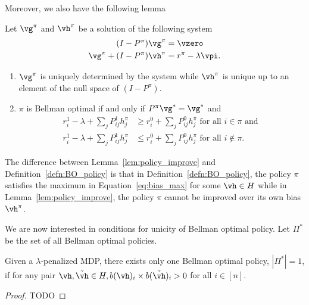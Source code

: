 Moreover, we also have the following lemma
\begin{lem}
    \label{lem:policy_improve}
    Let $\vg^\pi$ and $\vh^\pi$ be a solution of the following system
    \begin{align}
        (I-P^\pi)\vg^\pi &=\vzero \label{eq:gain_eval}\\
        \vg^\pi +(I-P^\pi)\vh^\pi &= r^\pi -\lambda\vpi \label{eq:bias_eval}.
    \end{align}
    \begin{enumerate}
        \item $\vg^\pi$ is uniquely determined by the system while $\vh^\pi$ is unique up to an element of the null space of $(I-P^\pi)$.
        \item $\pi$ is Bellman optimal if and only if $P^\pi\vg^*=\vg^*$ and
            \begin{align*}
                r^1_i-\lambda +\sum_{j}P^1_{ij}h^\pi_j &\ge r^0_i +\sum_{j}P^0_{ij}h^\pi_j \text{ for all } i\in\pi \text{ and } \\
                r^1_i-\lambda +\sum_{j}P^1_{ij}h^\pi_j &\le r^0_i +\sum_{j}P^0_{ij}h^\pi_j \text{ for all } i\notin\pi.
        \end{align*}
    \end{enumerate}
\end{lem}
The difference between Lemma~\ref{lem:policy_improve} and Definition~\ref{defn:BO_policy} is that in Definition~\ref{defn:BO_policy}, the policy $\pi$ satisfies the maximum in Equation~\eqref{eq:bias_max} for some $\vh\in H$ while in Lemma~\ref{lem:policy_improve}, the policy $\pi$ cannot be improved over its own bias $\vh^\pi$.

We are now interested in conditions for unicity of Bellman optimal policy.
Let $\Pi^*$ be the set of all Bellman optimal policies. 

\begin{lem}
\label{lem:unicity_BO}
Given a $\lambda$-penalized MDP, there exists only one Bellman optimal policy, $|\Pi^*|=1$, if for any pair $\vh, \tilde{\vh}\in H, b(\vh)_i\times b(\tilde{\vh})_i>0$ for all $i\in[n]$.
\end{lem}
\begin{proof}
    TODO
\end{proof}



